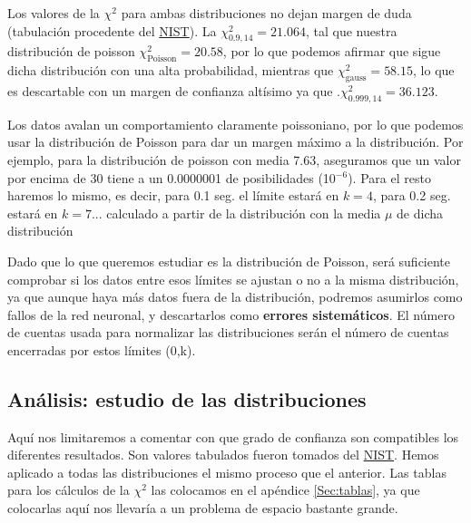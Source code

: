 \documentclass[11pt]{article}
\begin{document}
Los valores de la $\chi^2$ para ambas distribuciones no dejan margen de duda (tabulación procedente del \href{https://www.itl.nist.gov/div898/handbook/eda/section3/eda3674.htm}{NIST}). La $\chi^2_{0.9,14}=21.064$, tal que nuestra distribución de poisson $\chi^2_{\text{Poisson}}=20.58$, por lo que podemos afirmar que sigue dicha distribución con una alta probabilidad, mientras que $\chi^2_{\text{gauss}}=58.15$, lo que es descartable con un margen de confianza altísimo ya que $.\chi^2_{0.999,14}=36.123$.

Los datos avalan un comportamiento claramente poissoniano, por lo que podemos usar la distribución de Poisson para dar un margen máximo a la distribución. Por ejemplo, para la distribución de poisson con media 7.63, aseguramos que un valor por encima de 30 tiene a un 0.0000001 de posibilidades (10$^{-6}$). Para el resto haremos lo mismo, es decir, para 0.1 seg. el límite estará en $k=4$, para 0.2 seg. estará en $k=7$... calculado a partir de la distribución con la media $\mu$ de dicha distribución

Dado que lo que queremos estudiar es la distribución de Poisson, será suficiente comprobar si los datos entre esos límites se ajustan o no a la misma distribución, ya que aunque haya más datos fuera de la distribución, podremos asumirlos como fallos de la red neuronal, y descartarlos como \textbf{errores sistemáticos}. El número de cuentas usada para normalizar las distribuciones serán el número de cuentas encerradas por estos límites (0,k).

\subsection{Análisis: estudio de las distribuciones}

Aquí nos limitaremos a comentar con que grado de confianza son compatibles los diferentes resultados. Son valores tabulados fueron tomados del \href{https://www.itl.nist.gov/div898/handbook/eda/section3/eda3674.htm}{NIST}. Hemos aplicado a todas las distribuciones el mismo proceso que el anterior. Las tablas para los cálculos de la $\chi^2$ las colocamos en el apéndice \ref{Sec:tablas}, ya que colocarlas aquí nos llevaría a un problema de espacio bastante grande. 
\end{document}
